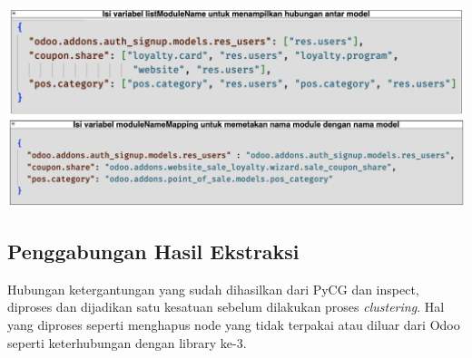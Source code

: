 \begin{center}
	\includegraphics[width=14cm]{img/bab_4/def_inspect_4.png}
	\label{fig:def_inspect_4}
\end{center}

\subsection{Penggabungan Hasil Ekstraksi}
Hubungan ketergantungan yang sudah dihasilkan dari PyCG dan inspect, diproses dan dijadikan satu kesatuan sebelum dilakukan proses \textit{clustering}. Hal yang diproses seperti menghapus node yang tidak terpakai atau diluar dari Odoo seperti keterhubungan dengan library ke-3.  

